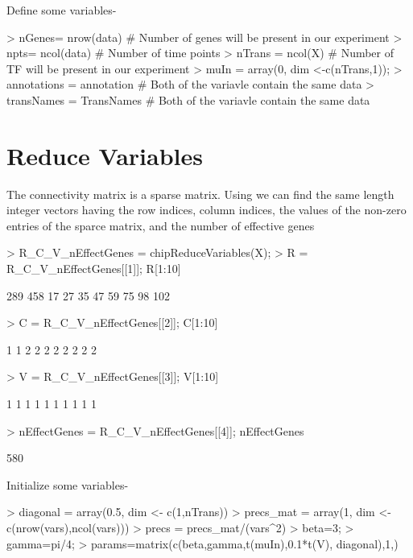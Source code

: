\documentclass[11pt, a4paper, oneside]{article}
\begin{document}
Define some variables-
\begin{Schunk}
\begin{Sinput}
> nGenes= nrow(data) # Number of genes will be present in our experiment
> npts= ncol(data) # Number of time points
> nTrans = ncol(X) # Number of TF will be present in our experiment
> muIn = array(0, dim <-c(nTrans,1)); 
> annotations = annotation # Both of the variavle contain the same data
> transNames = TransNames # Both of the variavle contain the same data
\end{Sinput}
\end{Schunk}

\section{Reduce Variables}
The connectivity matrix is a sparse matrix. Using  we can find the same length integer vectors having the row indices, column indices, the values of the non-zero entries of the sparce matrix, and the number of effective genes
\begin{Schunk}
\begin{Sinput}
> R_C_V_nEffectGenes = chipReduceVariables(X);
> R = R_C_V_nEffectGenes[[1]]; R[1:10]
\end{Sinput}
\begin{Soutput}
 [1] 289 458  17  27  35  47  59  75  98 102
\end{Soutput}
\begin{Sinput}
> C = R_C_V_nEffectGenes[[2]]; C[1:10]
\end{Sinput}
\begin{Soutput}
 [1] 1 1 2 2 2 2 2 2 2 2
\end{Soutput}
\begin{Sinput}
> V = R_C_V_nEffectGenes[[3]]; V[1:10]
\end{Sinput}
\begin{Soutput}
 [1] 1 1 1 1 1 1 1 1 1 1
\end{Soutput}
\begin{Sinput}
> nEffectGenes = R_C_V_nEffectGenes[[4]]; nEffectGenes
\end{Sinput}
\begin{Soutput}
[1] 580
\end{Soutput}
\end{Schunk}

Initialize some variables-
\begin{Schunk}
\begin{Sinput}
> diagonal = array(0.5, dim <- c(1,nTrans))
> precs_mat = array(1, dim <- c(nrow(vars),ncol(vars)))
> precs = precs_mat/(vars^2)
> beta=3;
> gamma=pi/4;
> params=matrix(c(beta,gamma,t(muIn),0.1*t(V), diagonal),1,)
\end{Sinput}
\end{Schunk}
\end{document}
